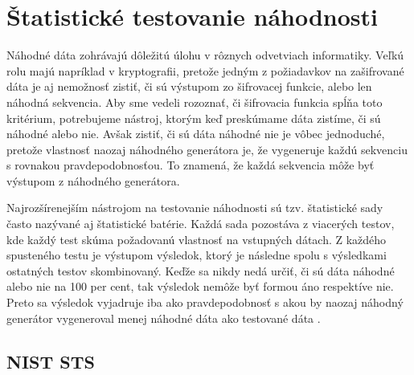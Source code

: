 \chapter{Štatistické testovanie náhodnosti}
\label{chap:statistic-tests}

Náhodné dáta zohrávajú dôležitú úlohu v rôznych odvetviach informatiky. Veľkú rolu majú napríklad v kryptografii, pretože jedným z požiadavkov na zašifrované dáta je aj nemožnosť zistiť, či sú výstupom zo šifrovacej funkcie, alebo len náhodná sekvencia. Aby sme vedeli rozoznať, či šifrovacia funkcia spĺňa toto kritérium, potrebujeme nástroj, ktorým keď preskúmame dáta zistíme, či sú náhodné alebo nie. Avšak zistiť, či sú dáta náhodné nie je vôbec jednoduché, pretože vlastnosť naozaj náhodného generátora je, že vygeneruje každú sekvenciu s rovnakou pravdepodobnosťou. To znamená, že každá sekvencia môže byť výstupom z náhodného generátora.

Najrozšírenejším nástrojom na testovanie náhodnosti sú tzv. štatistické sady často nazývané aj štatistické batérie. Každá sada pozostáva z viacerých testov, kde každý test skúma požadovanú vlastnosť na vstupných dátach. Z každého spusteného testu je výstupom výsledok, ktorý je následne spolu s výsledkami ostatných testov skombinovaný. Keďže sa nikdy nedá určiť, či sú dáta náhodné alebo nie na 100 per cent, tak výsledok nemôže byť formou áno respektíve nie. Preto sa výsledok vyjadruje iba ako pravdepodobnosť s akou by naozaj náhodný generátor vygeneroval menej náhodné dáta ako testované dáta \cite{nist-sts-interpretation-syso}. 

\section{NIST STS}
\label{sec:sts-nist}


